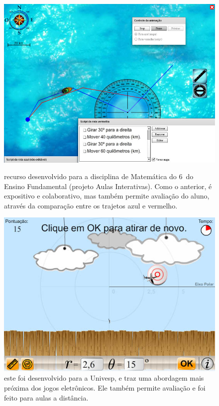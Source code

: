 	\begin{figure}
		\centering
		\begin{minipage}[t]{0.46\textwidth}
			\includegraphics[width=\textwidth]{images/navigation.jpg}
			\caption{\footnotesize recurso desenvolvido para a disciplina de Matemática do 6\textordmasculine\ do Ensino Fundamental (projeto Aulas Interativas). Como o anterior, é expositivo e colaborativo, mas também permite avaliação do aluno, através da comparação entre os trajetos azul e vermelho.}
			\label{fig:nav}
		\end{minipage}\hfill
		\begin{minipage}[t]{0.46\textwidth}
			\includegraphics[width=\textwidth]{images/polar.jpg}
			\caption{\footnotesize este  foi desenvolvido para a Univesp, e traz uma abordagem mais próxima dos jogos eletrônicos. Ele também permite avaliação e foi feito para aulas a distância.}
			\label{fig:polar}
		\end{minipage}
	\end{figure}
	
